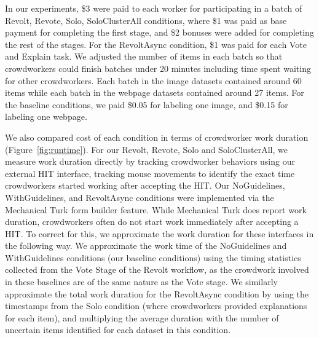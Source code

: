 In our experiments, \$3 were paid to each worker for participating in a batch of Revolt, Revote, Solo, SoloClusterAll conditions, where \$1 was paid as base payment for completing the first stage, and \$2 bonuses were added for completing the rest of the stages. For the RevoltAsync condition, \$1 was paid for each Vote and Explain task. We adjusted the number of items in each batch so that crowdworkers could finish batches under 20 minutes including time spent waiting for other crowdworkers. Each batch in the image datasets contained around 60 items while each batch in the webpage datasets contained around 27 items. For the baseline conditions, we paid \$0.05 for labeling one image, and \$0.15 for labeling one webpage. 

We also compared cost of each condition in terms of crowdworker work duration (Figure~\ref{fig:runtime}). For our Revolt, Revote, Solo and SoloClusterAll, we measure work duration directly by tracking crowdworker behaviors using our external HIT interface, tracking mouse movements to identify the exact time crowdworkers started working after accepting the HIT. Our NoGuidelines, WithGuidelines, and RevoltAsync conditions were implemented via the Mechanical Turk form builder feature. While Mechanical Turk does report work duration, crowdworkers often do not start work immediately after accepting a HIT. To correct for this, we approximate the work duration for these interfaces in the following way. We approximate the work time of the NoGuidelines and WithGuidelines conditions (our baseline conditions) using the timing statistics collected from the Vote Stage of the Revolt workflow, as the crowdwork involved in these baselines are of the same nature as the Vote stage. We similarly approximate the total work duration for the RevoltAsync condition by using the timestamps from the Solo condition (where crowdworkers provided explanations for each item), and multiplying the average duration with the number of uncertain items identified for each dataset in this condition.
 






